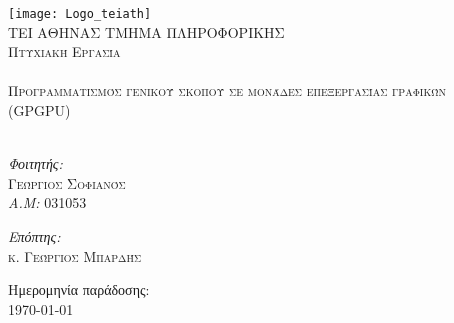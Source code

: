 \begin{titlepage}
\begin{center}

\texttt{[image: Logo\_teiath]}~\\[1cm]

\textsc{\LARGE ΤΕΙ ΑΘΗΝΑΣ ΤΜΗΜΑ ΠΛΗΡΟΦΟΡΙΚΗΣ}\\[1.5cm]

\textsc{\Large Πτυχιακή Εργασία}\\[0.5cm]

\HRule \\[0.4cm]
\textsc{\Large Προγραμματισμός γενικού σκοπού σε μονάδες επεξεργασίας γραφικών\\ (GPGPU)} \\[0.4cm]

\HRule \\[1.5cm]

\begin{minipage}[t]{0.4\textwidth}
\begin{flushleft} \large
\emph{Φοιτητής:}\\
\textsc{Γεώργιος Σοφιανός}\\
\emph{A.M:} 031053
\end{flushleft}
\end{minipage}
\begin{minipage}[t]{0.4\textwidth}
\begin{flushright} \large
\emph{Επόπτης:} \\
\textsc{κ. Γεώργιος Μπαρδής}
\end{flushright}
\end{minipage}

\vfill

{\large Ημερομηνία παράδοσης: \\ \today}

\end{center}
\end{titlepage}